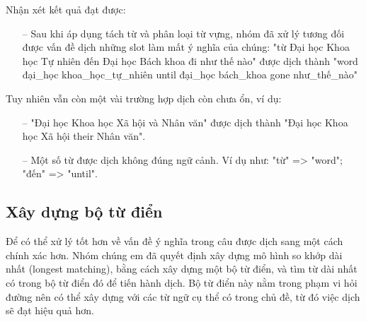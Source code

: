 Nhận xét kết quả đạt được:
\begin{itemize}
    \item[--] Sau khi áp dụng tách từ và phân loại từ vựng, nhóm đã xử lý tương đối được vấn đề dịch những slot làm mất ý nghĩa của chúng: "từ Đại học Khoa học Tự nhiên đến Đại học Bách khoa đi như thế nào" được dịch thành "word đại\_học khoa\_học\_tự\_nhiên until đại\_học bách\_khoa gone như\_thế\_nào"
\end{itemize}
Tuy nhiên vẫn còn một vài trường hợp dịch còn chưa ổn, ví dụ:
\begin{itemize}
    \item[--] "Đại học Khoa học Xã hội và Nhân văn" được dịch thành "Đại học Khoa học Xã hội their Nhân văn".
    \item[--] Một số từ được dịch không đúng ngữ cảnh. Ví dụ như: "từ" => "word"; "đến" => "until".
\end{itemize}


\subsection{Xây dựng bộ từ điển}
Để có thể xử lý tốt hơn về vấn đề ý nghĩa trong câu được dịch sang một cách chính xác hơn. Nhóm chúng em đã quyết định xây dựng mô hình so khớp dài nhất (longest matching), bằng cách xây dựng một bộ từ điển, và tìm từ dài nhất có trong bộ từ điển đó để tiến hành dịch. Bộ từ điển này nằm trong phạm vi hỏi đường nên có thể xây dựng với các từ ngữ cụ thể có trong chủ đề, từ đó việc dịch sẽ đạt hiệu quả hơn.

